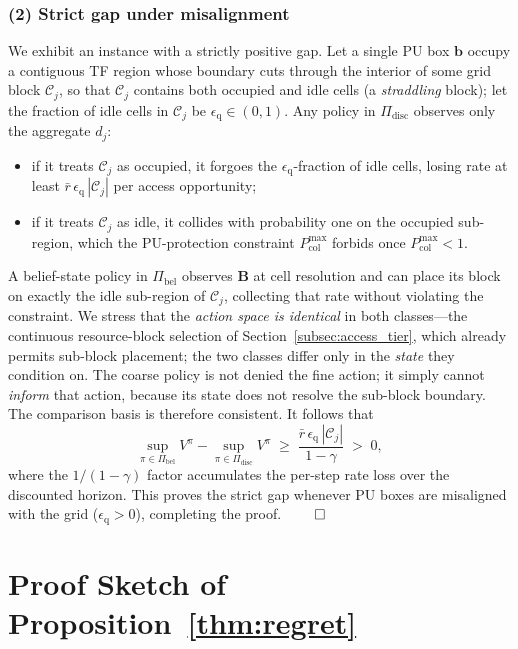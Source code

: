 \documentclass[journal]{IEEEtran}
\newcommand{\boxk}{\bm{b}}                 %
\newcommand{\belmap}{\bm{B}}               %
\newcommand{\pol}{\pi}                     %
\newcommand{\disc}{\gamma}                 %
\newcommand{\Vfun}{V}                      %
\newcommand{\Pcolmax}{P_{\mathrm{col}}^{\max}} %
\newcommand{\PIbel}{\Pi_{\mathrm{bel}}}    %
\newcommand{\PIdis}{\Pi_{\mathrm{disc}}}   %
\newcommand{\quanterr}{\epsilon_{\mathrm{q}}} %
\begin{document}
\subsubsection*{(2) Strict gap under misalignment}
We exhibit an instance with a strictly positive gap. Let a single PU box
$\boxk$ occupy a contiguous TF region whose boundary cuts through the
interior of some grid block $\mathcal{C}_j$, so that $\mathcal{C}_j$ contains
both occupied and idle cells (a \emph{straddling} block); let the
fraction of idle cells in $\mathcal{C}_j$ be $\quanterr\in(0,1)$. Any policy
in $\PIdis$ observes only the aggregate $d_j$:
\begin{itemize}
\item if it treats $\mathcal{C}_j$ as occupied, it forgoes the
$\quanterr$-fraction of idle cells, losing rate at least
$\bar r\,\quanterr\,|\mathcal{C}_j|$ per access opportunity;
\item if it treats $\mathcal{C}_j$ as idle, it collides with probability one
on the occupied sub-region, which the PU-protection constraint
$\Pcolmax$ forbids once $\Pcolmax<1$.
\end{itemize}
A belief-state policy in $\PIbel$ observes $\belmap$ at cell resolution and
can place its block on exactly the idle sub-region of $\mathcal{C}_j$,
collecting that rate without violating the constraint. We stress that the
\emph{action space is identical} in both classes---the continuous
resource-block selection of Section~\ref{subsec:access_tier}, which already
permits sub-block placement; the two classes differ only in the
\emph{state} they condition on. The coarse policy is not denied the fine
action; it simply cannot \emph{inform} that action, because its state does
not resolve the sub-block boundary. The comparison basis is therefore
consistent. It follows that
\begin{equation}
\sup_{\pol\in\PIbel}\Vfun^{\pol}-\sup_{\pol\in\PIdis}\Vfun^{\pol}
\;\ge\;
\frac{\bar r\,\quanterr\,|\mathcal{C}_j|}{1-\disc}\;>\;0,
\label{eq:appB_gap}
\end{equation}
where the $1/(1-\disc)$ factor accumulates the per-step rate loss over the
discounted horizon. This proves the strict gap whenever PU boxes are
misaligned with the grid ($\quanterr>0$), completing the proof. \hfill$\qed$

\section{Proof Sketch of Proposition~\ref{thm:regret}}
\label{sec:appendix_regret}
\end{document}
